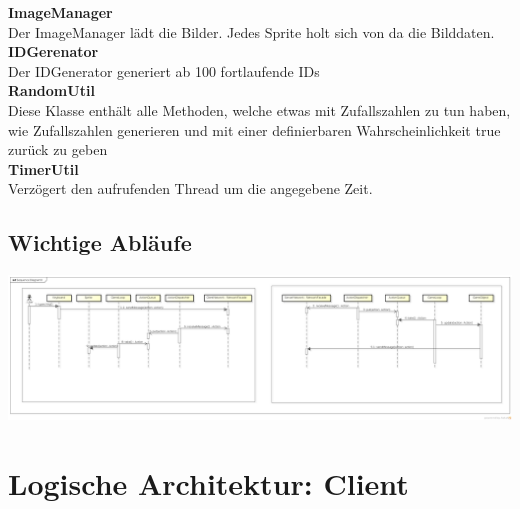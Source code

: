 \documentclass[11pt]{scrartcl}
\begin{document}
\textbf{ImageManager}\\
Der ImageManager lädt die Bilder. Jedes Sprite holt sich von da die Bilddaten.\\
 
\textbf{IDGerenator}\\
 Der IDGenerator generiert ab 100 fortlaufende IDs\\
 
\textbf{RandomUtil}\\
Diese Klasse enthält alle Methoden, welche etwas mit Zufallszahlen zu tun haben, wie Zufallszahlen generieren und mit einer definierbaren Wahrscheinlichkeit true zurück zu geben\\

\textbf{TimerUtil}\\
Verzögert den aufrufenden Thread um die angegebene Zeit.\\

\begin{landscape}
  \subsection{Wichtige Abläufe}
\includegraphics[scale=0.25]{SequenceDiagramAction}
\end{landscape}
\newpage
\section{Logische Architektur: Client}
\end{document}
